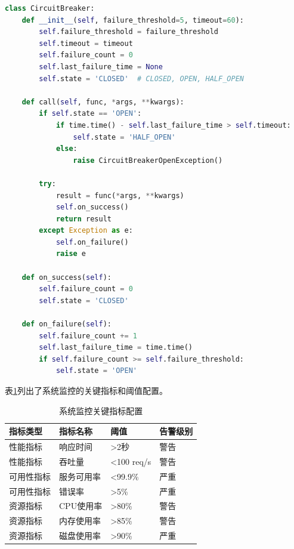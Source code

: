 \begin{lstlisting}[language=Python, label=fig:circuit_breaker]
class CircuitBreaker:
    def __init__(self, failure_threshold=5, timeout=60):
        self.failure_threshold = failure_threshold
        self.timeout = timeout
        self.failure_count = 0
        self.last_failure_time = None
        self.state = 'CLOSED'  # CLOSED, OPEN, HALF_OPEN
    
    def call(self, func, *args, **kwargs):
        if self.state == 'OPEN':
            if time.time() - self.last_failure_time > self.timeout:
                self.state = 'HALF_OPEN'
            else:
                raise CircuitBreakerOpenException()
        
        try:
            result = func(*args, **kwargs)
            self.on_success()
            return result
        except Exception as e:
            self.on_failure()
            raise e
    
    def on_success(self):
        self.failure_count = 0
        self.state = 'CLOSED'
    
    def on_failure(self):
        self.failure_count += 1
        self.last_failure_time = time.time()
        if self.failure_count >= self.failure_threshold:
            self.state = 'OPEN'
\end{lstlisting}

表\ref{table:monitoring_metrics}列出了系统监控的关键指标和阈值配置。

\begin{table}[H]
    \caption{系统监控关键指标配置}
    \label{table:monitoring_metrics}
    \centering
    \begin{tabular}{|l|l|l|l|}
        \hline
        \textbf{指标类型} & \textbf{指标名称} & \textbf{阈值} & \textbf{告警级别} \\
        \hline
        性能指标 & 响应时间 & >2秒 & 警告 \\
        性能指标 & 吞吐量 & <100 req/s & 警告 \\
        可用性指标 & 服务可用率 & <99.9\% & 严重 \\
        可用性指标 & 错误率 & >5\% & 严重 \\
        资源指标 & CPU使用率 & >80\% & 警告 \\
        资源指标 & 内存使用率 & >85\% & 警告 \\
        资源指标 & 磁盘使用率 & >90\% & 严重 \\
        \hline
    \end{tabular}
\end{table}

